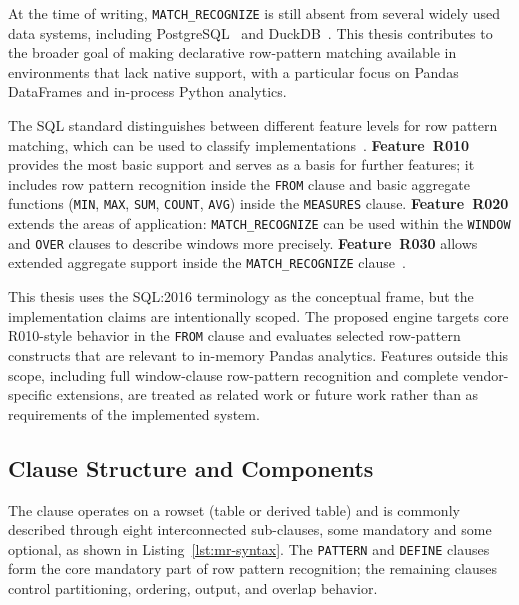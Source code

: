 At the time of writing, \texttt{MATCH\_RECOGNIZE} is still absent from
several widely used data systems, including
PostgreSQL~\cite{howe2020matchrecognize} and
DuckDB~\cite{findling2025bringing}.  This thesis contributes to
the broader goal of making declarative row-pattern matching available
in environments that lack native support, with a particular focus on
Pandas DataFrames and in-process Python analytics.

The SQL standard distinguishes between different feature levels for
row pattern matching, which can be used to classify
implementations~\cite{winand_match_recognize}.
\textbf{Feature~R010} provides the most basic support and serves
as a basis for further features; it includes row pattern
recognition inside the \texttt{FROM} clause and basic aggregate
functions (\texttt{MIN}, \texttt{MAX}, \texttt{SUM},
\texttt{COUNT}, \texttt{AVG}) inside the \texttt{MEASURES}
clause.  \textbf{Feature~R020} extends the areas of application:
\texttt{MATCH\_RECOGNIZE} can be used within the \texttt{WINDOW}
and \texttt{OVER} clauses to describe windows more precisely.
\textbf{Feature~R030} allows extended aggregate support inside the
\texttt{MATCH\_RECOGNIZE}
clause~\cite{ISO2021,michels2018new,melton2017sqlrpr}.

This thesis uses the SQL:2016 terminology as the conceptual frame,
but the implementation claims are intentionally scoped.  The proposed
engine targets core R010-style behavior in the \texttt{FROM} clause
and evaluates selected row-pattern constructs that are relevant to
in-memory Pandas analytics.  Features outside this scope, including
full window-clause row-pattern recognition and complete vendor-specific
extensions, are treated as related work or future work rather than as
requirements of the implemented system.

\subsection{Clause Structure and Components}
\label{subsec:bg-clause-structure}

The clause operates on a rowset (table or derived table) and is
commonly described through eight interconnected sub-clauses, some
mandatory and some optional, as shown in
Listing~\ref{lst:mr-syntax}.  The \texttt{PATTERN} and
\texttt{DEFINE} clauses form the core mandatory part of row pattern
recognition; the remaining clauses control partitioning, ordering,
output, and overlap behavior.

